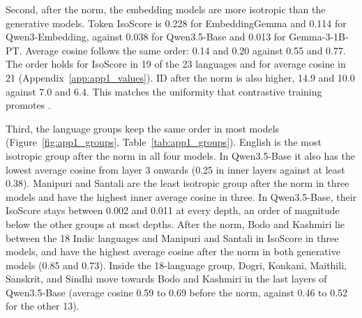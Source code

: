 Second, after the norm, the embedding models are more isotropic than the generative models. Token IsoScore is 0.228 for EmbeddingGemma and 0.114 for Qwen3-Embedding, against 0.038 for Qwen3.5-Base and 0.013 for Gemma-3-1B-PT. Average cosine follows the same order: 0.14 and 0.20 against 0.55 and 0.77. The order holds for IsoScore in 19 of the 23 languages and for average cosine in 21 (Appendix~\ref{app:app1_values}). ID after the norm is also higher, 14.9 and 10.0 against 7.0 and 6.4. This matches the uniformity that contrastive training promotes \citep{wang-isola-2020-understanding}.

Third, the language groups keep the same order in most models (Figure~\ref{fig:app1_groups}, Table~\ref{tab:app1_groups}). English is the most isotropic group after the norm in all four models. In Qwen3.5-Base it also has the lowest average cosine from layer 3 onwards (0.25 in inner layers against at least 0.38). Manipuri and Santali are the least isotropic group after the norm in three models and have the highest inner average cosine in three. In Qwen3.5-Base, their IsoScore stays between 0.002 and 0.011 at every depth, an order of magnitude below the other groups at most depths. After the norm, Bodo and Kashmiri lie between the 18 Indic languages and Manipuri and Santali in IsoScore in three models, and have the highest average cosine after the norm in both generative models (0.85 and 0.73). Inside the 18-language group, Dogri, Konkani, Maithili, Sanskrit, and Sindhi move towards Bodo and Kashmiri in the last layers of Qwen3.5-Base (average cosine 0.59 to 0.69 before the norm, against 0.46 to 0.52 for the other 13).

